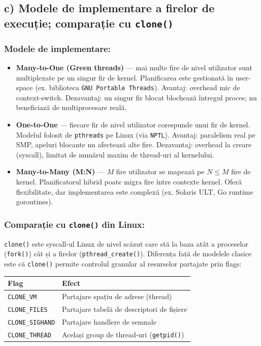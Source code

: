 \documentclass[11pt]{article}
\begin{document}
\subsection{c) Modele de implementare a firelor de execuție; comparație cu \texttt{clone()}}
\label{sec:orgb2a2278}

\subsubsection{Modele de implementare:}
\label{sec:org5b3554d}

\begin{itemize}
\item \textbf{Many-to-One (Green threads)} --- mai multe fire de nivel utilizator sunt multiplexate pe un singur fir de kernel. Planificarea este gestionată în user-space (ex. biblioteca \texttt{GNU Portable Threads}). Avantaj: overhead mic de context-switch. Dezavantaj: un singur fir blocat blochează întregul proces; nu beneficiază de multiprocesare reală.

\item \textbf{One-to-One} --- fiecare fir de nivel utilizator corespunde unui fir de kernel. Modelul folosit de \texttt{pthreads} pe Linux (via \texttt{NPTL}). Avantaj: paralelism real pe SMP, apeluri blocante nu afectează alte fire. Dezavantaj: overhead la creare (syscall), limitat de numărul maxim de thread-uri al kernelului.

\item \textbf{Many-to-Many (M:N)} --- \(M\) fire utilizator se mapează pe \(N \le M\) fire de kernel. Planificatorul hibrid poate migra fire între contexte kernel. Oferă flexibilitate, dar implementarea este complexă (ex. Solaris ULT, Go runtime goroutines).
\end{itemize}
\subsubsection{Comparație cu \texttt{clone()} din Linux:}
\label{sec:org7e72c57}

\texttt{clone()} este syscall-ul Linux de nivel scăzut care stă la baza atât a proceselor (\texttt{fork()}) cât și a firelor (\texttt{pthread\_create()}). Diferența față de modelele clasice este că \texttt{clone()} permite controlul granular al resurselor partajate prin flags:

\begin{center}
\begin{tabular}{ll}
Flag & Efect\\
\hline
\texttt{CLONE\_VM} & Partajare spațiu de adrese (thread)\\
\texttt{CLONE\_FILES} & Partajare tabelă de descriptori de fișiere\\
\texttt{CLONE\_SIGHAND} & Partajare handlere de semnale\\
\texttt{CLONE\_THREAD} & Același group de thread-uri (\texttt{getpid()})\\
\end{tabular}
\end{center}
\end{document}
